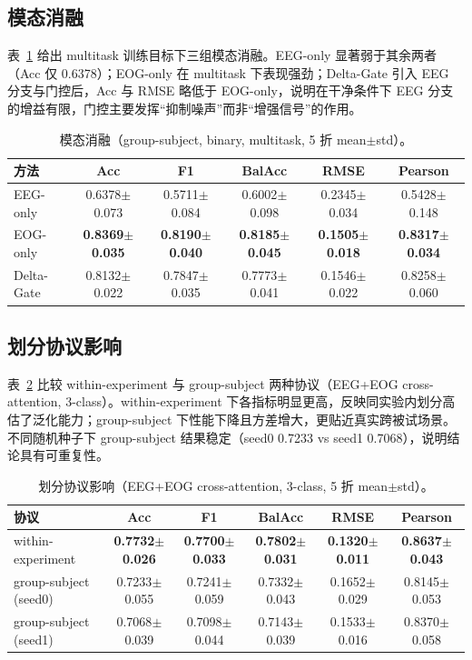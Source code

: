 \documentclass[11pt,a4paper]{ctexart}
\begin{document}
\subsection{模态消融}
表~\ref{tab:modality} 给出 multitask 训练目标下三组模态消融。EEG-only 显著弱于其余两者（Acc 仅 0.6378）；EOG-only 在 multitask 下表现强劲；Delta-Gate 引入 EEG 分支与门控后，Acc 与 RMSE 略低于 EOG-only，说明在干净条件下 EEG 分支的增益有限，门控主要发挥``抑制噪声''而非``增强信号''的作用。

\begin{table}[h]
\centering
\caption{模态消融（group-subject, binary, multitask, 5 折 mean$\pm$std）。}
\label{tab:modality}
\small
\begin{tabular}{lccccc}
\toprule
方法 & Acc & F1 & BalAcc & RMSE & Pearson \\
\midrule
EEG-only & 0.6378$\pm$0.073 & 0.5711$\pm$0.084 & 0.6002$\pm$0.098 & 0.2345$\pm$0.034 & 0.5428$\pm$0.148 \\
EOG-only & \textbf{0.8369$\pm$0.035} & \textbf{0.8190$\pm$0.040} & \textbf{0.8185$\pm$0.045} & \textbf{0.1505$\pm$0.018} & \textbf{0.8317$\pm$0.034} \\
Delta-Gate & 0.8132$\pm$0.022 & 0.7847$\pm$0.035 & 0.7773$\pm$0.041 & 0.1546$\pm$0.022 & 0.8258$\pm$0.060 \\
\bottomrule
\end{tabular}
\end{table}

\subsection{划分协议影响}
表~\ref{tab:split} 比较 within-experiment 与 group-subject 两种协议（EEG+EOG cross-attention, 3-class）。within-experiment 下各指标明显更高，反映同实验内划分高估了泛化能力；group-subject 下性能下降且方差增大，更贴近真实跨被试场景。不同随机种子下 group-subject 结果稳定（seed0 0.7233 vs seed1 0.7068），说明结论具有可重复性。

\begin{table}[h]
\centering
\caption{划分协议影响（EEG+EOG cross-attention, 3-class, 5 折 mean$\pm$std）。}
\label{tab:split}
\small
\begin{tabular}{lccccc}
\toprule
协议 & Acc & F1 & BalAcc & RMSE & Pearson \\
\midrule
within-experiment & \textbf{0.7732$\pm$0.026} & \textbf{0.7700$\pm$0.033} & \textbf{0.7802$\pm$0.031} & \textbf{0.1320$\pm$0.011} & \textbf{0.8637$\pm$0.043} \\
group-subject (seed0) & 0.7233$\pm$0.055 & 0.7241$\pm$0.059 & 0.7332$\pm$0.043 & 0.1652$\pm$0.029 & 0.8145$\pm$0.053 \\
group-subject (seed1) & 0.7068$\pm$0.039 & 0.7098$\pm$0.044 & 0.7143$\pm$0.039 & 0.1533$\pm$0.016 & 0.8370$\pm$0.058 \\
\bottomrule
\end{tabular}
\end{table}
\end{document}
